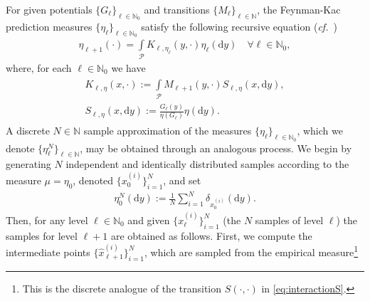 \documentclass{article}
\newcommand{\cP}{\mathcal{P}}
\newcommand{\IE}{\mathbb{E}}
\newcommand{\IN}{\mathbb{N}}
\renewcommand{\d}{{\text{d}}}
\newcommand{\dy}{{\d y}}
\theoremstyle{definition}
\begin{document}
For given potentials $\{{G}_{\ell}\}_{\ell\in\IN_0}$ and transitions $\{{M}_{\ell}\}_{\ell\in\IN}$, the Feynman-Kac prediction measures
$\{\eta_\ell\}_{\ell\in\IN_0}$ satisfy the following recursive equation
(\emph{cf.}~\cite[Sec.~2.5.2]{DelMoralFeynmanKac2004})
\begin{align*}
  \eta_{\ell+1}(\cdot)=\int\limits_\cP K_{\ell, \eta_{\ell}}(y, \cdot)\eta_\ell (\d y)\quad\forall\ell\in\IN_0,
\end{align*}
where, for each $\ell\in\IN_0$ we have
\begin{gather}
  \label{eq:interactionS}
  \begin{gathered}
    K_{\ell, \eta}(x,\cdot):=\int\limits_\cP M_{\ell+1}(y, \cdot)S_{\ell,\eta}(x, \dy),\\
    S_{\ell,\eta}(x,\dy) := \frac{G_\ell(y)}{\eta(G_{\ell})}\eta(\dy).
  \end{gathered}
\end{gather}
A discrete $N\in\IN$ sample approximation of the measures $\{\eta_\ell\}_{\ell\in\IN_0}$,
which we denote $\{\eta^{N}_\ell\}_{\ell\in\IN}$, may be obtained through an analogous process.
We begin by generating $N$ independent and identically distributed samples according to the measure $\mu=\eta_0$,
denoted $\{x_0^{(i)}\}_{i=1}^{N}$, and set
\begin{align*}
  \eta_0^{N}(\dy):=\frac{1}{N}\sum\limits_{i=1}^N\delta_{x_0^{(i)}}(\dy).
\end{align*}
Then, for any level $\ell\in\IN_0$ and given $\{x_{\ell}^{(i)}\}_{i=1}^{N}$ (the $N$ samples of level $\ell$)
the samples for level $\ell+1$ are obtained as follows. First, we compute the intermediate points $\{\hat{x}_{\ell+1}^{(i)}\}_{i=1}^N$, which are sampled from the empirical measure\footnote{This is the discrete analogue of the transition $S(\cdot,\cdot)$ in \cref{eq:interactionS}.}
\end{document}
